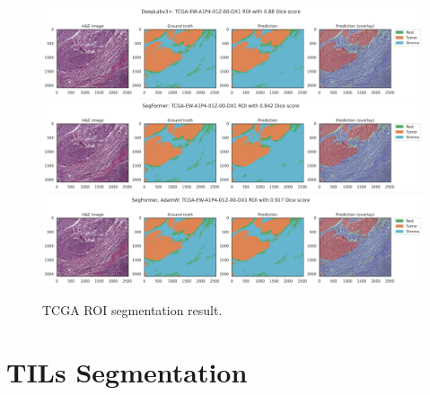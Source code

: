 \begin{figure}[H]
\includegraphics[width=\linewidth]{figures/tissue/deeplabv3+_dice_tcga_TCGA-EW-A1P4-01Z-00-DX13E9AE553-83D4-4B09-AB7F-D096BCE3BC4D_[8630,_17717,_11173,_19809]_check.png}
\includegraphics[width=\linewidth]{figures/tissue/segformer_dice_tcga_TCGA-EW-A1P4-01Z-00-DX13E9AE553-83D4-4B09-AB7F-D096BCE3BC4D_[8630,_17717,_11173,_19809]_check.png}
\includegraphics[width=\linewidth]{figures/tissue/segformer,_adamw_dice_tcga_TCGA-EW-A1P4-01Z-00-DX13E9AE553-83D4-4B09-AB7F-D096BCE3BC4D_[8630,_17717,_11173,_19809]_check.png}

\caption{TCGA ROI segmentation result.}
\label{fig:TCGA-EW-A1P4}
\end{figure}



\section{TILs Segmentation}

